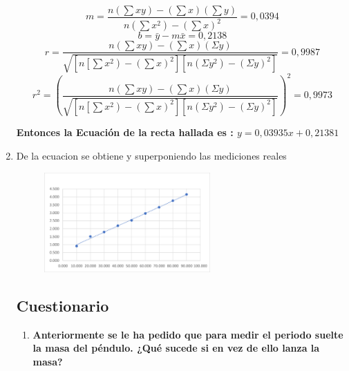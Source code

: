 \documentclass[10pt]{article}
\begin{document}
\begin{enumerate}
\begin{equation*}
     m=\dfrac{n\left(\sum x y\right)-\left(\sum x\right)\left(\sum y\right)}{n\left(\sum x^2\right)-\left(\sum x\right)^2}=0,0394
 \end{equation*}
\begin{equation*}
    b=\bar{y}-m \bar{x}=0,2138
\end{equation*} 
 \begin{equation*}
r=\dfrac{n\left(\sum x y\right)-\left(\sum x\right)(\Sigma y)}{\sqrt{\left[n\left[\sum x^2\right)-\left(\sum x\right)^2\right]\left[n\left(\Sigma y^2\right)-(\Sigma y)^2\right]}}=0,9987
 \end{equation*}
\begin{equation*}
r^2=(\dfrac{n\left(\sum x y\right)-\left(\sum x\right)(\Sigma y)}{\sqrt{\left[n\left[\sum x^2\right)-\left(\sum x\right)^2\right]\left[n\left(\Sigma y^2\right)-(\Sigma y)^2\right]}})^2=0,9973
 \end{equation*}

\textbf{Entonces la Ecuación de la recta hallada es : $y = 0,03935x + 0,21381$}
\item De la ecuacion se obtiene y superponiendo las mediciones reales

\begin{figure}[H]
	\begin{center}
 		\includegraphics[width = 0.6\textwidth]{Imagenes/Imagen3.png}
	\end{center} 
\end{figure}


\subsection{Cuestionario}
\begin{enumerate}
    \item \textbf{Anteriormente se le ha pedido que para medir el periodo suelte la masa del péndulo. ¿Qué sucede si en vez de ello lanza la masa?}


\end{enumerate}
\end{enumerate}
\end{document}
